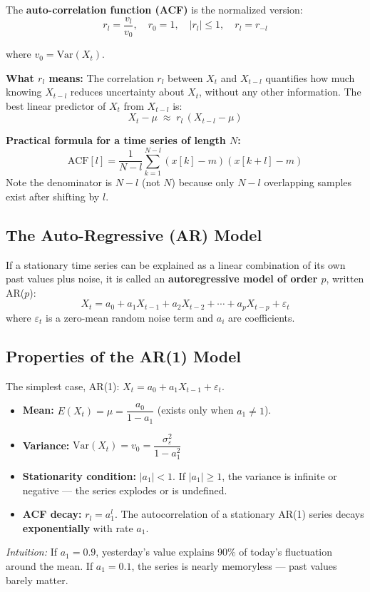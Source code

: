 \documentclass[11pt]{article}
\begin{document}
The \textbf{auto-correlation function (ACF)} is the normalized version:
\[
r_l = \frac{v_l}{v_0}, \quad r_0 = 1,\quad |r_l| \leq 1,\quad r_l = r_{-l}
\]

where $v_0 = \text{Var}(X_t)$.

\textbf{What $r_l$ means:} The correlation $r_l$ between $X_t$ and $X_{t-l}$
quantifies how much knowing $X_{t-l}$ reduces uncertainty about $X_t$, without
any other information. The best linear predictor of $X_t$ from $X_{t-l}$ is:
\[
X_t - \mu \;\approx\; r_l\,(X_{t-l} - \mu)
\]

\textbf{Practical formula for a time series of length $N$:}
\[
\text{ACF}[l] = \frac{1}{N - l}\sum_{k=1}^{N-l}(x[k]-m)(x[k+l]-m)
\]
Note the denominator is $N - l$ (not $N$) because only $N - l$ overlapping
samples exist after shifting by $l$.

\subsection{The Auto-Regressive (AR) Model}
If a stationary time series can be explained as a linear combination of its own past
values plus noise, it is called an \textbf{autoregressive model of order $p$},
written AR($p$):
\[
X_t = a_0 + a_1 X_{t-1} + a_2 X_{t-2} + \cdots + a_p X_{t-p} + \varepsilon_t
\]
where $\varepsilon_t$ is a zero-mean random noise term and $a_i$ are coefficients.

\subsection{Properties of the AR(1) Model}
The simplest case, AR(1): $X_t = a_0 + a_1 X_{t-1} + \varepsilon_t$.

\begin{itemize}
    \item \textbf{Mean:} $E(X_t) = \mu = \dfrac{a_0}{1 - a_1}$
      (exists only when $a_1 \neq 1$).
    \item \textbf{Variance:} $\text{Var}(X_t) = v_0 = \dfrac{\sigma_\varepsilon^2}{1 - a_1^2}$
    \item \textbf{Stationarity condition:} $|a_1| < 1$.
      If $|a_1| \geq 1$, the variance is infinite or negative --- the series
      explodes or is undefined.
    \item \textbf{ACF decay:} $r_l = a_1^l$. The autocorrelation of a stationary
      AR(1) series decays \textbf{exponentially} with rate $a_1$.
\end{itemize}

\textit{Intuition:} If $a_1 = 0.9$, yesterday's value explains 90\% of today's
fluctuation around the mean. If $a_1 = 0.1$, the series is nearly memoryless
--- past values barely matter.
\end{document}
